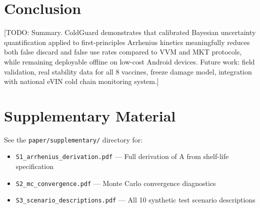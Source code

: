 \documentclass[12pt,a4paper]{article}
\begin{document}
\section{Conclusion}
\label{sec:conclusion}

[TODO: Summary. ColdGuard demonstrates that calibrated Bayesian uncertainty
quantification applied to first-principles Arrhenius kinetics meaningfully
reduces both false discard and false use rates compared to VVM and MKT protocols,
while remaining deployable offline on low-cost Android devices. Future work:
field validation, real stability data for all 8 vaccines, freeze damage model,
integration with national eVIN cold chain monitoring system.]




\appendix
\section{Supplementary Material}
\label{sec:supplementary}

See the \texttt{paper/supplementary/} directory for:
\begin{itemize}
  \item \texttt{S1\_arrhenius\_derivation.pdf} — Full derivation of A from shelf-life specification
  \item \texttt{S2\_mc\_convergence.pdf} — Monte Carlo convergence diagnostics
  \item \texttt{S3\_scenario\_descriptions.pdf} — All 10 synthetic test scenario descriptions
\end{itemize}
\end{document}

